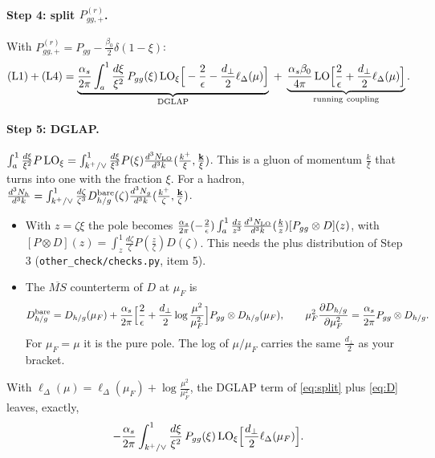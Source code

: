 \documentclass[10pt]{article}
\numberwithin{equation}{section}
\newcommand{\LO}{{\rm LO}}
\begin{document}
\paragraph{Step 4: split $P^{(r)}_{gg,+}$.} With $P^{(r)}_{gg,+}=P_{gg}-\frac{\beta_0}{2}\delta(1-\xi)$:
\begin{equation}
({\rm L1})+({\rm L4})=\underbrace{\frac{\alpha_s}{2\pi}\int_a^1\frac{d\xi}{\xi^2}\,P_{gg}(\xi)\,\LO_\xi\Big[-\frac2\epsilon-\frac{d_\perp}{2}\ell_\Delta(\mu)\Big]}_{\rm DGLAP}\;+\;\underbrace{\frac{\alpha_s\beta_0}{4\pi}\,\LO\Big[\frac2\epsilon+\frac{d_\perp}{2}\ell_\Delta(\mu)\Big]}_{\rm running\ coupling}.\label{eq:split}
\end{equation}

\paragraph{Step 5: DGLAP.} $\int_a^1\frac{d\xi}{\xi^2}P\,\LO_\xi=\int_{k^+/\vee}^1\frac{d\xi}{\xi^3}P(\xi)\frac{d^3N_{\rm LO}}{d^3k}(\frac{k^+}{\xi},\frac{\mathbf k}{\xi})$. This is a gluon of momentum $\frac{k}{\xi}$ that turns into one with the fraction $\xi$. For a hadron, $\frac{d^3N_h}{d^3k}=\int_{k^+/\vee}^1\frac{d\zeta}{\zeta^3}D^{\rm bare}_{h/g}(\zeta)\frac{d^3N_g}{d^3k}(\frac{k^+}{\zeta},\frac{\mathbf k}{\zeta})$.
\begin{itemize}
\item With $z=\zeta\xi$ the pole becomes $\frac{\alpha_s}{2\pi}(-\frac2\epsilon)\int_a^1\frac{dz}{z^3}\frac{d^3N_{\rm LO}}{d^3k}(\frac kz)[P_{gg}\otimes D](z)$, with $[P\otimes D](z)=\int_z^1\frac{d\zeta}{\zeta}P(\frac z\zeta)D(\zeta)$. This needs the plus distribution of Step 3 (\texttt{other\_check/checks.py}, item 5).
\item The $\overline{MS}$ counterterm of $D$ at $\mu_F$ is
\begin{equation}
D^{\rm bare}_{h/g}=D_{h/g}(\mu_F)+\frac{\alpha_s}{2\pi}\Big[\frac2\epsilon+\frac{d_\perp}{2}\log\frac{\mu^2}{\mu_F^2}\Big]P_{gg}\otimes D_{h/g}(\mu_F),\qquad\mu_F^2\frac{\partial D_{h/g}}{\partial\mu_F^2}=\frac{\alpha_s}{2\pi}P_{gg}\otimes D_{h/g}.\label{eq:D}
\end{equation}
For $\mu_F=\mu$ it is the pure pole. The log of $\mu/\mu_F$ carries the same $\frac{d_\perp}{2}$ as your bracket.
\end{itemize}
With $\ell_\Delta(\mu)=\ell_\Delta(\mu_F)+\log\frac{\mu^2}{\mu_F^2}$, the DGLAP term of \eqref{eq:split} plus \eqref{eq:D} leaves, exactly,
\begin{equation}
-\frac{\alpha_s}{2\pi}\int_{k^+/\vee}^1\frac{d\xi}{\xi^2}\,P_{gg}(\xi)\,\LO_\xi\Big[\frac{d_\perp}{2}\ell_\Delta(\mu_F)\Big].\label{eq:dglap0}
\end{equation}
\end{document}
